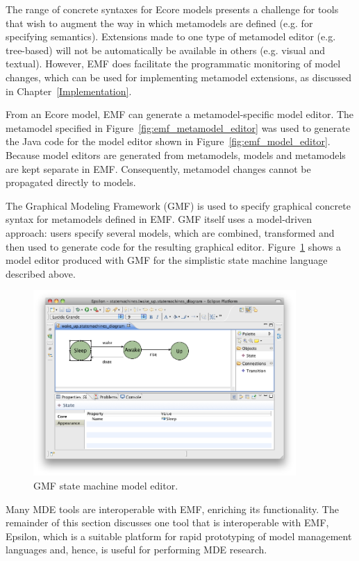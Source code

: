 The range of concrete syntaxes for Ecore models presents a challenge for tools that wish to augment the way in which metamodels are defined (e.g. for specifying semantics). Extensions made to one type of metamodel editor (e.g. tree-based) will not be automatically be available in others (e.g. visual and textual). However, EMF does facilitate the programmatic monitoring of model changes, which can be used for implementing metamodel extensions, as discussed in Chapter~\ref{Implementation}. 

From an Ecore model, EMF can generate a metamodel-specific model editor. The metamodel specified in Figure~\ref{fig:emf_metamodel_editor} was used to generate the Java code for the model editor shown in Figure~\ref{fig:emf_model_editor}. Because model editors are generated from metamodels, models and metamodels are kept separate in EMF. Consequently, metamodel changes cannot be propagated directly to models.

The Graphical Modeling Framework (GMF) \cite{gronback06gmf} is used to specify graphical concrete syntax for metamodels defined in EMF. GMF itself uses a model-driven approach: users specify several models, which are combined, transformed and then used to generate code for the resulting graphical editor. Figure~\ref{fig:gmf_model_editor} shows a model editor produced with GMF for the simplistic state machine language described above.

\begin{figure}[htbp]
  \begin{center}
    \leavevmode
    \includegraphics[width=10cm]{2.Background/images/gmf_model_editor.png}
  \end{center}
  \caption{GMF state machine model editor.}
  \label{fig:gmf_model_editor}
\end{figure}

Many MDE tools are interoperable with EMF, enriching its functionality. The remainder of this section discusses one tool that is interoperable with EMF, Epsilon, which is a suitable platform for rapid prototyping of model management languages and, hence, is useful for performing MDE research.

